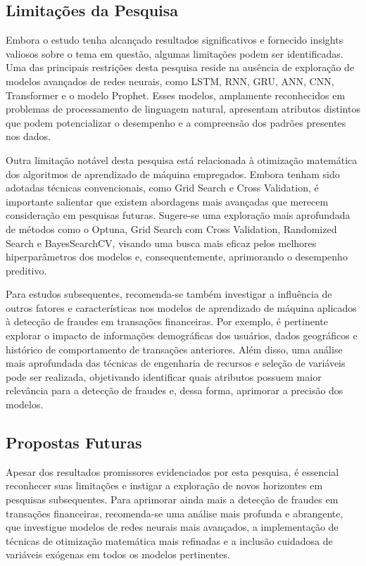 \subsection{Limita\c c\~oes da Pesquisa}


Embora o estudo tenha alcançado resultados significativos e fornecido insights valiosos sobre o tema em questão, algumas limitações podem ser identificadas. Uma das principais restrições desta pesquisa reside na ausência de exploração de modelos avançados de redes neurais, como LSTM, RNN, GRU, ANN, CNN, Transformer e o modelo Prophet. Esses modelos, amplamente reconhecidos em problemas de processamento de linguagem natural, apresentam atributos distintos que podem potencializar o desempenho e a compreensão dos padrões presentes nos dados.

Outra limitação notável desta pesquisa está relacionada à otimização matemática dos algoritmos de aprendizado de máquina empregados. Embora tenham sido adotadas técnicas convencionais, como Grid Search e Cross Validation, é importante salientar que existem abordagens mais avançadas que merecem consideração em pesquisas futuras. Sugere-se uma exploração mais aprofundada de métodos como o Optuna, Grid Search com Cross Validation, Randomized Search e BayesSearchCV, visando uma busca mais eficaz pelos melhores hiperparâmetros dos modelos e, consequentemente, aprimorando o desempenho preditivo.

Para estudos subsequentes, recomenda-se também investigar a influência de outros fatores e características nos modelos de aprendizado de máquina aplicados à detecção de fraudes em transações financeiras. Por exemplo, é pertinente explorar o impacto de informações demográficas dos usuários, dados geográficos e histórico de comportamento de transações anteriores. Além disso, uma análise mais aprofundada das técnicas de engenharia de recursos e seleção de variáveis pode ser realizada, objetivando identificar quais atributos possuem maior relevância para a detecção de fraudes e, dessa forma, aprimorar a precisão dos modelos.

\subsection{Propostas Futuras}

Apesar dos resultados promissores evidenciados por esta pesquisa, é essencial reconhecer suas limitações e instigar a exploração de novos horizontes em pesquisas subsequentes. Para aprimorar ainda mais a detecção de fraudes em transações financeiras, recomenda-se uma análise mais profunda e abrangente, que investigue modelos de redes neurais mais avançados, a implementação de técnicas de otimização matemática mais refinadas e a inclusão cuidadosa de variáveis exógenas em todos os modelos pertinentes.

